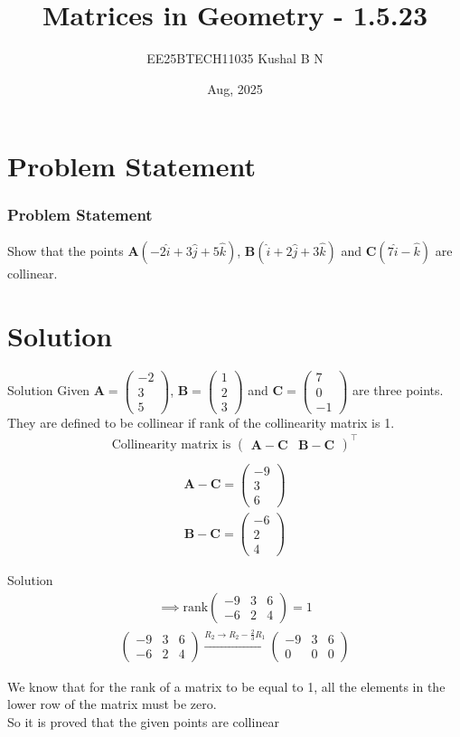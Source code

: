 \documentclass{beamer}
\title{Matrices in Geometry - 1.5.23}
\author{EE25BTECH11035  Kushal B N}
\date{Aug, 2025}
\let\vec\mathbf
\providecommand{\brak}[1]{\ensuremath{\left(#1\right)}}
\theoremstyle{remark}
\newcommand{\myvec}[1]{\ensuremath{\begin{pmatrix}#1\end{pmatrix}}}
\begin{document}
\maketitle


\begin{frame}
\tableofcontents
\end{frame}
\section{Problem Statement}
\begin{frame}
\frametitle{Problem Statement}
Show that the points $\vec{A}\brak{-2\hat{i}+3\hat{j}+5\hat{k}}$, $\vec{B}\brak{\hat{i}+2\hat{j}+3\hat{k}}$ and $\vec{C}\brak{7\hat{i}-\hat{k}}$ are collinear.
\end{frame}

\section{Solution}
\begin{frame}{Solution}
   Given $\vec{A}=\myvec{-2\\3\\5}$, $\vec{B}=\myvec{1\\2\\3}$ and $\vec{C}=\myvec{7\\0\\-1}$ are three points.\\
   They are defined to be collinear if rank of the collinearity matrix is 1.
   \begin{align*}
    \text{Collinearity matrix is }\myvec{\vec{A}- \vec{C} & \vec{B}-\vec{C}}^{\top}\\
   \end{align*}
\begin{align}
\vec{A}-\vec{C}=\myvec{-9\\3\\6}
\end{align}
\begin{align}
\vec{B}-\vec{C}=\myvec{-6\\2\\4}
\end{align}
    
\end{frame}



\begin{frame}{Solution}
\begin{align}
\implies \text{rank}\myvec{-9&3&6 \\ -6&2&4} = 1
\end{align}
\begin{align}
 \myvec{-9&3&6\\ -6&2&4}\overset{R_2 \rightarrow R_2 - \frac{2}{3}R_1}{\longrightarrow} \myvec{-9&3&6\\0&0&0}
 \end{align}

We know that for the rank of a matrix to be equal to 1, all the elements in the lower row of the matrix must be zero.\\
So it is proved that the given points are collinear
\end{frame}
\end{document}
